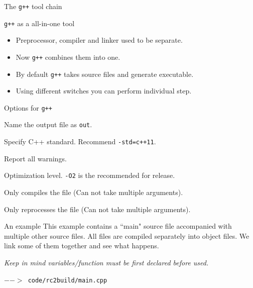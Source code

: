 \begin{frame}{The \texttt{g++} tool chain}
\begin{block}{\texttt{g++} as a all-in-one tool}
	\vspace{-0.07in}
	\begin{itemize}
		\item Preprocessor, compiler and linker used to be separate.
		\item Now \texttt{g++} combines them into one.
		\item By default \texttt{g++} takes source files and generate executable.
		\item Using different switches you can perform individual step.
	\end{itemize}
\end{block}
\vspace{-0.15in}
\begin{block}{Options for \texttt{g++}}
	\vspace{-0.07in}
	\begin{description}[-O\{0123\}]
		\small
		\item[-o out] Name the output file as \texttt{out}.
		\item[-std=] Specify C++ standard. Recommend \texttt{-std=c++11}.
		\item[-Wall] Report all warnings.
		\item[-O\{0123\}] Optimization level. \texttt{-O2} is the recommended for release.
		\item[-c] Only compiles the file (Can not take multiple arguments).
		\item[-E] Only reprocesses the file (Can not take multiple arguments).
	\end{description}
\end{block}
\end{frame}

\begin{frame}[fragile]{An example}
This example contains a ``main" source file accompanied with multiple other source files. All files are compiled separately into object files. We link some of them together and see what happens.

\vspace{0.04in}
\textit{Keep in mind variables/function must be first declared before used.}

\vspace{0.04in}
\texttt{$-->$ code/rc2build/main.cpp}
\inputminted{c++}{code/rc2build/main.cpp}
\end{frame}


